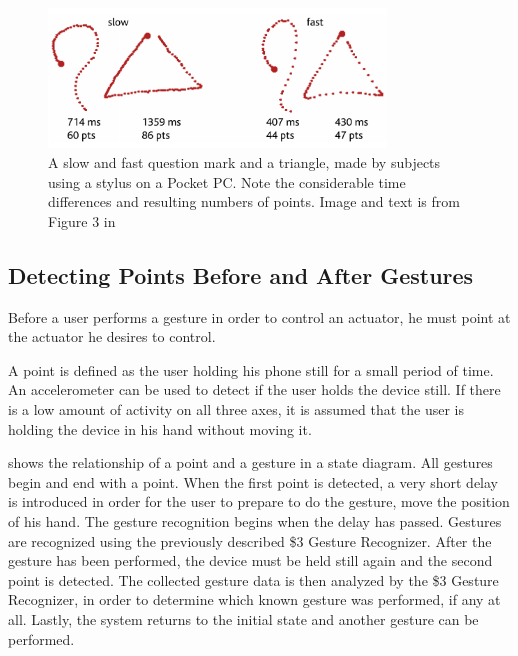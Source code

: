 \begin{figure}[!htb]
  \centering
  \includegraphics[width=0.8\textwidth]{images/1-dollar-gesturetrace.png}
  \caption{A slow and fast question mark and a triangle, made by subjects using a stylus on a Pocket PC. Note the considerable time differences and resulting numbers of points. Image and text is from Figure 3 in \cite{wobbrock2007gestures}}
  \label{fig:onedollar-gesturetrace}
\end{figure}

\subsection{Detecting Points Before and After Gestures}
Before a user performs a gesture in order to control an actuator, 
he must point at the actuator he desires to control. 

A point is defined as the user holding his phone still for a small period of time. 
An accelerometer can be used to detect if the user holds the device still. 
If there is a low amount of activity on all three axes, 
it is assumed that the user is holding the device in his hand without moving it.

 shows the relationship of a point and a gesture in a state diagram. 
All gestures begin and end with a point. 
When the first point is detected, 
a very short delay is introduced in order for the user to prepare to do the gesture, 
\eg move the position of his hand. 
The gesture recognition begins when the delay has passed. 
Gestures are recognized using the previously described \$3 Gesture Recognizer. 
After the gesture has been performed, 
the device must be held still again and the second point is detected. 
The collected gesture data is then analyzed by the \$3 Gesture Recognizer, 
in order to determine which known gesture was performed, if any at all. 
Lastly, the system returns to the initial state and another gesture can be performed.

